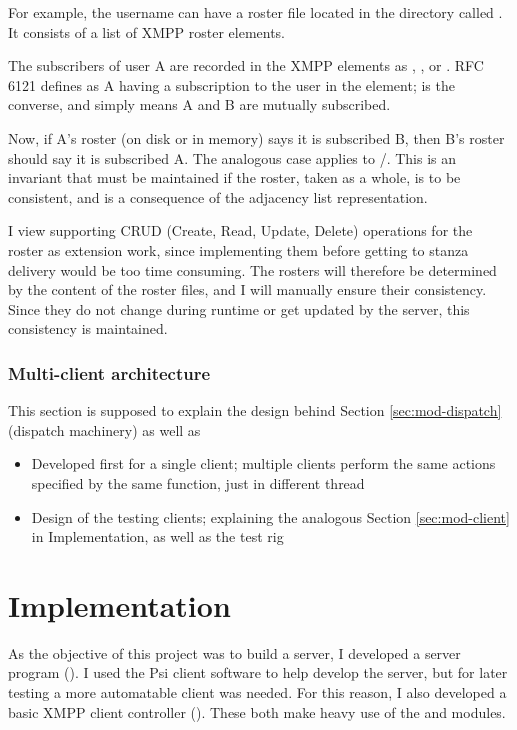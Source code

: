\documentclass[12pt,a4paper,twoside,openright]{report}
\begin{document}
{For example, the username  can have a roster file located in the  directory called . It consists of a list of XMPP roster  elements.

The subscribers of user A are recorded in the XMPP  elements as , , or . RFC 6121 defines  as A having a subscription to the user in the  element;  is the converse, and  simply means A and B are mutually subscribed.

Now, if A's roster (on disk or in memory) says it is subscribed  B, then B's roster should say it is subscribed  A. The analogous case applies to /. This is an invariant that must be maintained if the roster, taken as a whole, is to be consistent, and is a consequence of the adjacency list representation.

I view supporting CRUD (Create, Read, Update, Delete) operations for the roster as extension work, since implementing them before getting to stanza delivery would be too time consuming. The rosters will therefore be determined by the content of the roster files, and I will manually ensure their consistency. Since they do not change during runtime or get updated by the server, this consistency is maintained.

\subsection{Multi-client architecture}
This section is supposed to explain the design behind Section \ref{sec:mod-dispatch} (dispatch machinery) as well as
\begin{itemize}
  \item Developed first for a single client; multiple clients perform the same actions specified by the same function, just in  different thread
  \item Design of the testing clients; explaining the analogous Section \ref{sec:mod-client} in Implementation, as well as the test rig
\end{itemize}


\chapter{Implementation}
As the objective of this project was to build a server, I developed a server program (). I used the Psi client software to help develop the server, but for later testing a more automatable client was needed. For this reason, I also developed a basic XMPP client controller ().
These both make heavy use of the  and  modules.

}
\end{document}
